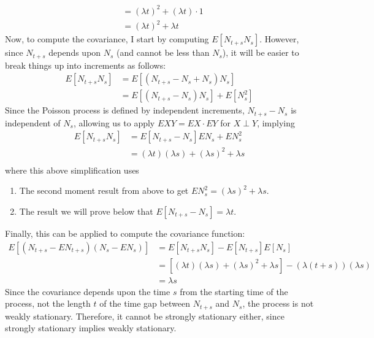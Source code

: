\documentclass[12pt]{article}
\theoremstyle{plain}
\theoremstyle{definition}
\theoremstyle{remark}
\begin{document}
\begin{enumerate}
\begin{enumerate}
\begin{align*}
          &=(\lambda t)^2 + (\lambda t) \cdot 1\\
          &=(\lambda t)^2 + \lambda t
        \end{align*}
        Now, to compute the covariance, I start by computing
        $E[N_{t+s}N_s]$. However, since $N_{t+s}$ depends upon $N_s$
        (and cannot be less than $N_s$), it will be easier to break
        things up into increments as follows:
        \begin{align*}
          E[N_{t+s} N_s]
            &= E[(N_{t+s} - N_s + N_s)N_s] \\
            &= E[(N_{t+s} - N_s)N_s] + E[N^2_s]
        \end{align*}
        Since the Poisson process is defined by independent increments,
        $N_{t+s}-N_s$ is independent of $N_s$, allowing us to apply $EXY
        = EX\cdot EY$ for $X\perp Y$, implying
        \begin{align*}
          E[N_{t+s} N_s]
            &= E[N_{t+s} - N_s]EN_s + EN^2_s \\
            &= (\lambda t) (\lambda s) + (\lambda s)^2 + \lambda s \\
        \end{align*}
        where this above simplification uses
        \begin{enumerate}
          \item The second moment result from above to get
            $EN_s^2=(\lambda s)^2 + \lambda s$.
        \item The result we will prove below that $E[N_{t+s}-N_s] =
          \lambda t$.
        \end{enumerate}
        Finally, this can be applied to compute the covariance function:
        \begin{align*}
          E[(N_{t+s}-EN_{t+s})(N_s-EN_s)]
            &= E[N_{t+s}N_{s}] - E[N_{t+s}]E[N_{s}]\\
            &= \left[(\lambda t) (\lambda s) + (\lambda s)^2 + \lambda s
              \right] - (\lambda(t+s))(\lambda s)\\
            &= \lambda s
        \end{align*}
        Since the covariance depends upon the time $s$ from the starting
        time of the process, not the length $t$ of the time gap between
        $N_{t+s}$ and $N_s$, the process is not weakly stationary.
        Therefore, it cannot be strongly stationary either, since
        strongly stationary implies weakly stationary.


\end{enumerate}
\end{enumerate}
\end{document}

